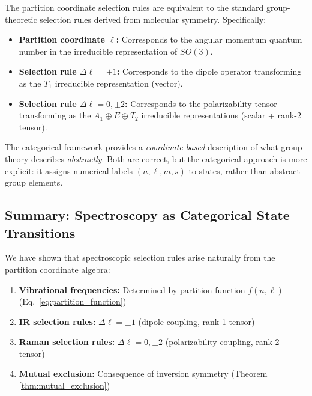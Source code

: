 \documentclass[twocolumn,10pt]{article}
\theoremstyle{remark}
\begin{document}
The partition coordinate selection rules are equivalent to the standard group-theoretic selection rules derived from molecular symmetry. Specifically:

\begin{itemize}
    \item \textbf{Partition coordinate $\ell$:} Corresponds to the angular momentum quantum number in the irreducible representation of $SO(3)$.

    \item \textbf{Selection rule $\Delta \ell = \pm 1$:} Corresponds to the dipole operator transforming as the $T_1$ irreducible representation (vector).

    \item \textbf{Selection rule $\Delta \ell = 0, \pm 2$:} Corresponds to the polarizability tensor transforming as the $A_1 \oplus E \oplus T_2$ irreducible representations (scalar + rank-2 tensor).
\end{itemize}

The categorical framework provides a \textit{coordinate-based} description of what group theory describes \textit{abstractly}. Both are correct, but the categorical approach is more explicit: it assigns numerical labels $(n, \ell, m, s)$ to states, rather than abstract group elements.

\subsection{Summary: Spectroscopy as Categorical State Transitions}

We have shown that spectroscopic selection rules arise naturally from the partition coordinate algebra:

\begin{enumerate}
    \item \textbf{Vibrational frequencies:} Determined by partition function $f(n, \ell)$ (Eq.~\ref{eq:partition_function})

    \item \textbf{IR selection rules:} $\Delta \ell = \pm 1$ (dipole coupling, rank-1 tensor)

    \item \textbf{Raman selection rules:} $\Delta \ell = 0, \pm 2$ (polarizability coupling, rank-2 tensor)

    \item \textbf{Mutual exclusion:} Consequence of inversion symmetry (Theorem \ref{thm:mutual_exclusion})
\end{enumerate}
\end{document}

